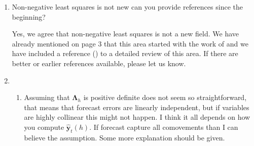 \documentclass[10pt,a4paper]{article}
\begin{document}
\begin{enumerate}



\item
  Non-negative least squares is not new can you provide references since the beginning?

  {\color{blue} Yes, we agree that non-negative least squares is not a new field. We have already mentioned on page 3 that this area started with the work of \citet{Lawson1974} and we have included a reference (\citet{Chen2009}) to a detailed review of this area. If there are better or earlier references available, please let us know.}

\item
  \begin{enumerate}
  \item
    Assuming that $\bm{\Lambda}_h$ is positive definite does not seem so straightforward, that means that forecast errors are linearly independent, but if variables are highly collinear this might not happen. I think it all depends on how you compute $\hat{\bm{y}}_t(h)$. If forecast capture all comovements than I can believe the assumption. Some more explanation should be given.


\end{enumerate}
\end{enumerate}
\end{document}

